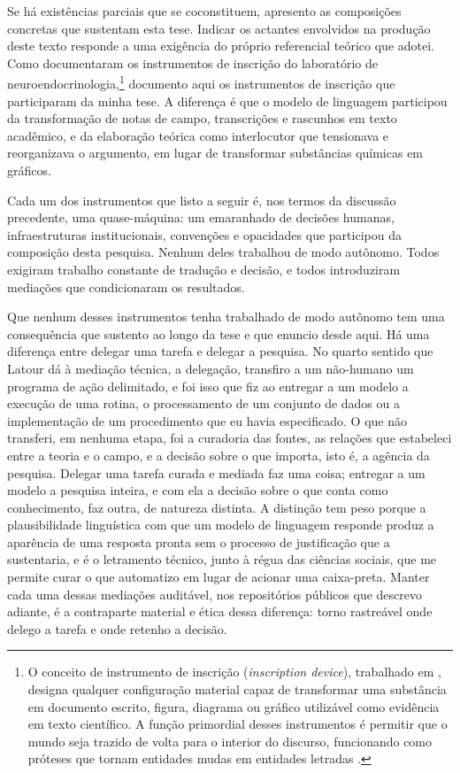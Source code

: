 Se há existências parciais que se coconstituem, apresento as composições concretas que sustentam esta tese. Indicar os actantes envolvidos na produção deste texto responde a uma exigência do próprio referencial teórico que adotei. Como \textcite{Latour1997VidaLaboratorio} documentaram os instrumentos de inscrição do laboratório de neuroendocrinologia,\footnote{O conceito de instrumento de inscrição (\textit{inscription device}), trabalhado em \textcite{Latour1997VidaLaboratorio}, designa qualquer configuração material capaz de transformar uma substância em documento escrito, figura, diagrama ou gráfico utilizável como evidência em texto científico. A função primordial desses instrumentos é permitir que o mundo seja trazido de volta para o interior do discurso, funcionando como próteses que tornam entidades mudas em entidades letradas \parencite{Latour1990Drawing}.} documento aqui os instrumentos de inscrição que participaram da minha tese. A diferença é que o modelo de linguagem participou da transformação de notas de campo, transcrições e rascunhos em texto acadêmico, e da elaboração teórica como interlocutor que tensionava e reorganizava o argumento, em lugar de transformar substâncias químicas em gráficos.

Cada um dos instrumentos que listo a seguir é, nos termos da discussão precedente, uma quase-máquina: um emaranhado de decisões humanas, infraestruturas institucionais, convenções e opacidades que participou da composição desta pesquisa. Nenhum deles trabalhou de modo autônomo. Todos exigiram trabalho constante de tradução e decisão, e todos introduziram mediações que condicionaram os resultados.

Que nenhum desses instrumentos tenha trabalhado de modo autônomo tem uma consequência que sustento ao longo da tese e que enuncio desde aqui. Há uma diferença entre delegar uma tarefa e delegar a pesquisa. No quarto sentido que Latour dá à mediação técnica, a delegação, transfiro a um não-humano um programa de ação delimitado, e foi isso que fiz ao entregar a um modelo a execução de uma rotina, o processamento de um conjunto de dados ou a implementação de um procedimento que eu havia especificado. O que não transferi, em nenhuma etapa, foi a curadoria das fontes, as relações que estabeleci entre a teoria e o campo, e a decisão sobre o que importa, isto é, a agência da pesquisa. Delegar uma tarefa curada e mediada faz uma coisa; entregar a um modelo a pesquisa inteira, e com ela a decisão sobre o que conta como conhecimento, faz outra, de natureza distinta. A distinção tem peso porque a plausibilidade linguística com que um modelo de linguagem responde produz a aparência de uma resposta pronta sem o processo de justificação que a sustentaria, e é o letramento técnico, junto à régua das ciências sociais, que me permite curar o que automatizo em lugar de acionar uma caixa-preta. Manter cada uma dessas mediações auditável, nos repositórios públicos que descrevo adiante, é a contraparte material e ética dessa diferença: torno rastreável onde delego a tarefa e onde retenho a decisão.

